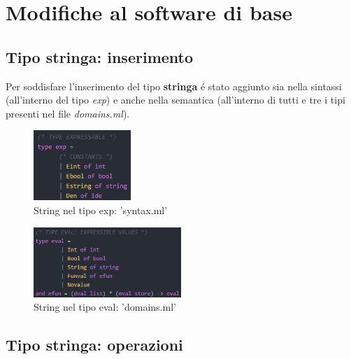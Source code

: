 \documentclass[a4paper,titlepage]{book}
\begin{document}
\chapter{Modifiche al software di base}

\section{Tipo stringa: inserimento}
Per soddisfare l'inserimento del tipo \textbf{stringa} \'e stato aggiunto sia nella sintassi (all'interno del tipo \textit{exp}) e anche
nella semantica (all'interno di tutti e tre i tipi presenti nel file \textit{domains.ml}).

\begin{figure}[H]
\center
\includegraphics[height=100px]{img/type_exp.png}
\caption{String nel tipo exp: 'syntax.ml' \label{fig:type_exp}}
\end{figure}

\begin{figure}[H]
\center
\includegraphics[height=100px]{img/type_eval.png}
\caption{String nel tipo eval: 'domains.ml' \label{fig:type_eval}}
\end{figure}

\clearpage
\section{Tipo stringa: operazioni}
\end{document}
